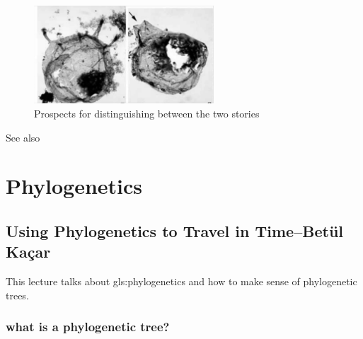 \documentclass[]{article}
\begin{document}
\begin{figure}[H]
	\begin{center}
		\caption[Prospects for distinguishing between the two stories]{Prospects for distinguishing between the two stories\cite{javaux2003recognizing}}\label{fig:Javaux}
		\includegraphics[width=0.6\textwidth]{Javaux}
	\end{center}
\end{figure}
  
See also \cite{martin2015endosymbiotic}
\section{Phylogenetics}\label{sec:phylogenetics}


\subsection[Using Phylogenetics to Travel in Time]{Using Phylogenetics to Travel in Time--Bet{\"u}l Ka{\c c}ar}

This lecture talks about \gls{gls:phylogenetics} and how to make sense of phylogenetic trees.
\subsubsection{what is a phylogenetic tree?}
\end{document}
